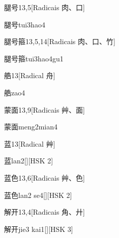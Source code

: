 \begin{entry}{腿号}{13,5}[Radicais ⾁、⼝]
  \begin{phonetics}{腿号}{tui3hao4}
  \end{phonetics}
\end{entry}

\begin{entry}{腿号箍}{13,5,14}[Radicais ⾁、⼝、⽵]
  \begin{phonetics}{腿号箍}{tui3hao4gu1}
  \end{phonetics}
\end{entry}

\begin{entry}{艁}{13}[Radical ⾈]
  \begin{phonetics}{艁}{zao4}
  \end{phonetics}
\end{entry}

\begin{entry}{蒙面}{13,9}[Radicais ⾋、⾯]
  \begin{phonetics}{蒙面}{meng2mian4}
  \end{phonetics}
\end{entry}

\begin{entry}{蓝}{13}[Radical ⾋]
  \begin{phonetics}{蓝}{lan2}[][HSK 2]
  \end{phonetics}
\end{entry}

\begin{entry}{蓝色}{13,6}[Radicais ⾋、⾊]
  \begin{phonetics}{蓝色}{lan2 se4}[][HSK 2]
  \end{phonetics}
\end{entry}

\begin{entry}{解开}{13,4}[Radicais ⾓、⼶]
  \begin{phonetics}{解开}{jie3 kai1}[][HSK 3]
  \end{phonetics}
\end{entry}

